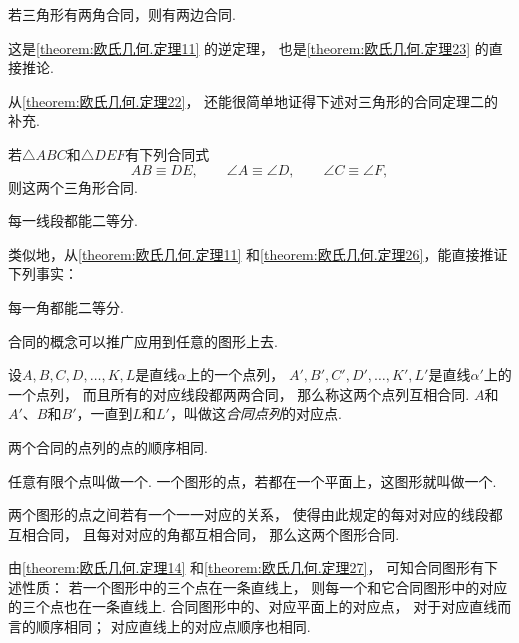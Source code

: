 \begin{theorem}\label{theorem:欧氏几何.定理24}
若三角形有两角合同，则有两边合同.
\end{theorem}
这是\cref{theorem:欧氏几何.定理11} 的逆定理，
也是\cref{theorem:欧氏几何.定理23} 的直接推论.

从\cref{theorem:欧氏几何.定理22}，
还能很简单地证得下述对三角形的合同定理二的补充.
\begin{theorem}\label{theorem:欧氏几何.定理25}
若\(\triangle ABC\)和\(\triangle DEF\)有下列合同式\begin{equation*}
	AB \equiv DE, \qquad
	\angle A \equiv \angle D, \qquad
	\angle C \equiv \angle F,
\end{equation*}
则这两个三角形合同.
\end{theorem}

\begin{theorem}\label{theorem:欧氏几何.定理26}
每一线段都能二等分.
\end{theorem}

类似地，从\cref{theorem:欧氏几何.定理11} 和\cref{theorem:欧氏几何.定理26}，能直接推证下列事实：
\begin{theorem}
每一角都能二等分.
\end{theorem}

合同的概念可以推广应用到任意的图形上去.

\begin{definition}
设\(A,B,C,D,\dotsc,K,L\)是直线\(\alpha\)上的一个点列，
\(A',B',C',D',\dotsc,K',L'\)是直线\(\alpha'\)上的一个点列，
而且所有的对应线段都两两合同，
那么称这两个点列互相合同.
\(A\)和\(A'\)、\(B\)和\(B'\)，一直到\(L\)和\(L'\)，叫做这\emph{合同点列}的对应点.
\end{definition}

\begin{theorem}\label{theorem:欧氏几何.定理27}
两个合同的点列的点的顺序相同.
\end{theorem}

\begin{definition}
任意有限个点叫做一个.
一个图形的点，若都在一个平面上，这图形就叫做一个.
\end{definition}

两个图形的点之间若有一个一一对应的关系，
使得由此规定的每对对应的线段都互相合同，
且每对对应的角都互相合同，
那么这两个图形合同.

由\cref{theorem:欧氏几何.定理14}
和\cref{theorem:欧氏几何.定理27}，
可知合同图形有下述性质：
若一个图形中的三个点在一条直线上，
则每一个和它合同图形中的对应的三个点也在一条直线上.
合同图形中的、对应平面上的对应点，
对于对应直线而言的顺序相同；
对应直线上的对应点顺序也相同.

